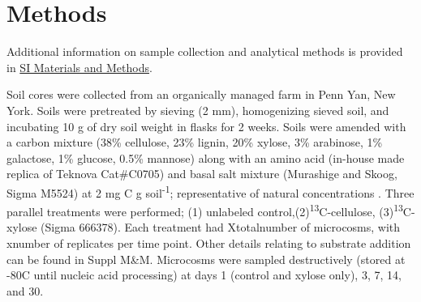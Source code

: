 \section{Methods}
Additional information on sample collection and analytical methods is provided in \href{https://www.authorea.com/users/3537/articles/8459/_show_article}{SI Materials and Methods}.


Soil cores were collected from an organically managed farm in Penn Yan, New York. Soils were pretreated by sieving (2 mm), homogenizing sieved soil, and incubating 10 g of dry soil weight in flasks for 2 weeks. Soils were amended with a carbon mixture (38\% cellulose, 23\% lignin, 20\% xylose, 3\% arabinose, 1\% galactose, 1\% glucose, 0.5\% mannose) along with an amino acid (in-house made replica of Teknova Cat#C0705) and basal salt mixture (Murashige and Skoog, Sigma M5524) at 2 mg C g soil\textsuperscript{-1}; representative of natural concentrations \cite{Schneckenberger_2008}. Three parallel treatments were performed; (1) unlabeled control,(2)\textsuperscript{13}C-cellulose, (3)\textsuperscript{13}C-xylose (Sigma 
666378). Each treatment had Xtotalnumber of microcosms, with xnumber of replicates per time point. Other details relating to substrate addition can be found in Suppl M&M. Microcosms were sampled destructively (stored at -80{\textdegree}C until nucleic acid processing) at days 1 (control and xylose only), 3, 7, 14, and 30.



